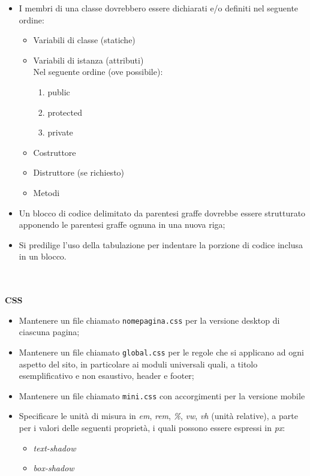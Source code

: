\documentclass[a4paper, 12pt]{article}
\begin{document}
\begin{itemize}
    \item I membri di una classe dovrebbero essere dichiarati e/o definiti nel seguente ordine:
    \begin{itemize}
        \item Variabili di classe (statiche)
        \item Variabili di istanza (attributi) \\
        Nel seguente ordine (ove possibile):
        \begin{enumerate}
            \item public
            \item protected
            \item private
        \end{enumerate}
        \item Costruttore
        \item Distruttore (se richiesto)
        \item Metodi
    \end{itemize}
    \item Un blocco di codice delimitato da parentesi graffe dovrebbe essere strutturato apponendo le parentesi graffe ognuna in una nuova riga;
    \item Si predilige l'uso della tabulazione per indentare la porzione di codice inclusa in un blocco.
\paragraph{}\\
\end{itemize}
\textbf{CSS}
\begin{itemize}
    \item Mantenere un file chiamato \texttt{nomepagina.css} per la versione desktop di ciascuna pagina;
    \item Mantenere un file chiamato \texttt{global.css} per le regole che si applicano ad ogni aspetto del sito, in particolare ai moduli universali quali, a titolo esemplificativo e non esaustivo, header e footer;
    \item Mantenere un file chiamato \texttt{mini.css} con accorgimenti per la versione mobile
    \item Specificare le unità di misura in \textit{em}, \textit{rem}, \textit{\%}, \textit{vw}, \textit{vh} (unità relative), a parte per i valori delle seguenti proprietà, i quali possono essere espressi in \textit{px}:
    \begin{itemize}
        \item \textit{text-shadow}
        \item \textit{box-shadow}
    \end{itemize}
\end{itemize}
\end{document}
